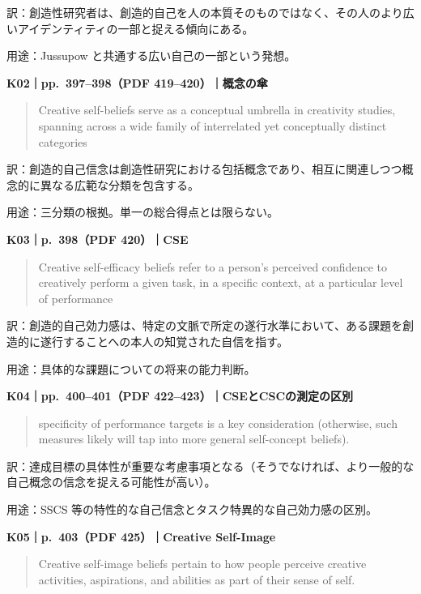 \documentclass[
  11pt,
  a4paper,
]{article}
\begin{document}
訳：創造性研究者は、創造的自己を人の本質そのものではなく、その人のより広いアイデンティティの一部と捉える傾向にある。

用途：Jussupow と共通する広い自己の一部という発想。


\textbf{K02｜pp.~397--398（PDF 419--420）｜概念の傘}

\begin{quote}
Creative self-beliefs serve as a conceptual umbrella in creativity
studies, spanning across a wide family of interrelated yet conceptually
distinct categories
\end{quote}

訳：創造的自己信念は創造性研究における包括概念であり、相互に関連しつつ概念的に異なる広範な分類を包含する。

用途：三分類の根拠。単一の総合得点とは限らない。


\textbf{K03｜p.~398（PDF 420）｜CSE}

\begin{quote}
Creative self-efficacy beliefs refer to a person's perceived confidence
to creatively perform a given task, in a specific context, at a
particular level of performance
\end{quote}

訳：創造的自己効力感は、特定の文脈で所定の遂行水準において、ある課題を創造的に遂行することへの本人の知覚された自信を指す。

用途：具体的な課題についての将来の能力判断。


\textbf{K04｜pp.~400--401（PDF 422--423）｜CSEとCSCの測定の区別}

\begin{quote}
specificity of performance targets is a key consideration (otherwise,
such measures likely will tap into more general self-concept beliefs).
\end{quote}

訳：達成目標の具体性が重要な考慮事項となる（そうでなければ、より一般的な自己概念の信念を捉える可能性が高い）。

用途：SSCS 等の特性的な自己信念とタスク特異的な自己効力感の区別。


\textbf{K05｜p.~403（PDF 425）｜Creative Self-Image}

\begin{quote}
Creative self-image beliefs pertain to how people perceive creative
activities, aspirations, and abilities as part of their sense of self.
\end{quote}
\end{document}
